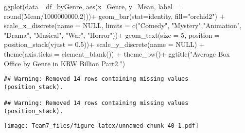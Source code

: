 \documentclass[
]{article}
\newenvironment{Shaded}{\begin{snugshade}}{\end{snugshade}}
\newcommand{\AttributeTok}[1]{\textcolor[rgb]{0.77,0.63,0.00}{#1}}
\newcommand{\ConstantTok}[1]{\textcolor[rgb]{0.00,0.00,0.00}{#1}}
\newcommand{\DecValTok}[1]{\textcolor[rgb]{0.00,0.00,0.81}{#1}}
\newcommand{\FloatTok}[1]{\textcolor[rgb]{0.00,0.00,0.81}{#1}}
\newcommand{\FunctionTok}[1]{\textcolor[rgb]{0.00,0.00,0.00}{#1}}
\newcommand{\NormalTok}[1]{#1}
\newcommand{\SpecialCharTok}[1]{\textcolor[rgb]{0.00,0.00,0.00}{#1}}
\newcommand{\StringTok}[1]{\textcolor[rgb]{0.31,0.60,0.02}{#1}}
\begin{document}
\begin{Shaded}
\begin{Highlighting}[]
\FunctionTok{ggplot}\NormalTok{(}\AttributeTok{data=}\NormalTok{ df\_byGenre, }\FunctionTok{aes}\NormalTok{(}\AttributeTok{x=}\NormalTok{Genre, }\AttributeTok{y=}\NormalTok{Mean, }
      \AttributeTok{label =} \FunctionTok{round}\NormalTok{(Mean}\SpecialCharTok{/}\DecValTok{1000000000}\NormalTok{,}\DecValTok{2}\NormalTok{)))}\SpecialCharTok{+}
  \FunctionTok{geom\_bar}\NormalTok{(}\AttributeTok{stat=}\StringTok{\textquotesingle{}identity\textquotesingle{}}\NormalTok{, }\AttributeTok{fill=}\StringTok{"orchid2"}\NormalTok{) }\SpecialCharTok{+}
  \FunctionTok{scale\_x\_discrete}\NormalTok{(}\AttributeTok{name =} \ConstantTok{NULL}\NormalTok{, }
                   \AttributeTok{limits =} \FunctionTok{c}\NormalTok{(}\StringTok{"Comedy"}\NormalTok{, }\StringTok{"Mystery"}\NormalTok{,}\StringTok{"Animation"}\NormalTok{, }\StringTok{"Drama"}\NormalTok{, }\StringTok{"Musical"}\NormalTok{, }\StringTok{"War"}\NormalTok{, }\StringTok{"Horror"}\NormalTok{))}\SpecialCharTok{+}
  \FunctionTok{geom\_text}\NormalTok{(}\AttributeTok{size =} \DecValTok{5}\NormalTok{, }\AttributeTok{position =} \FunctionTok{position\_stack}\NormalTok{(}\AttributeTok{vjust =} \FloatTok{0.5}\NormalTok{))}\SpecialCharTok{+}
  \FunctionTok{scale\_y\_discrete}\NormalTok{(}\AttributeTok{name =} \ConstantTok{NULL}\NormalTok{) }\SpecialCharTok{+}
  \FunctionTok{theme}\NormalTok{(}\AttributeTok{axis.ticks =} \FunctionTok{element\_blank}\NormalTok{()) }\SpecialCharTok{+}
  \FunctionTok{theme\_bw}\NormalTok{()}\SpecialCharTok{+}
  \FunctionTok{ggtitle}\NormalTok{(}\StringTok{"Average Box Office by Genre in KRW Billion Part2."}\NormalTok{)}
\end{Highlighting}
\end{Shaded}

\begin{verbatim}
## Warning: Removed 14 rows containing missing values (position_stack).

## Warning: Removed 14 rows containing missing values (position_stack).
\end{verbatim}

\texttt{[image: Team7\_files/figure-latex/unnamed-chunk-40-1.pdf]}
\end{document}

